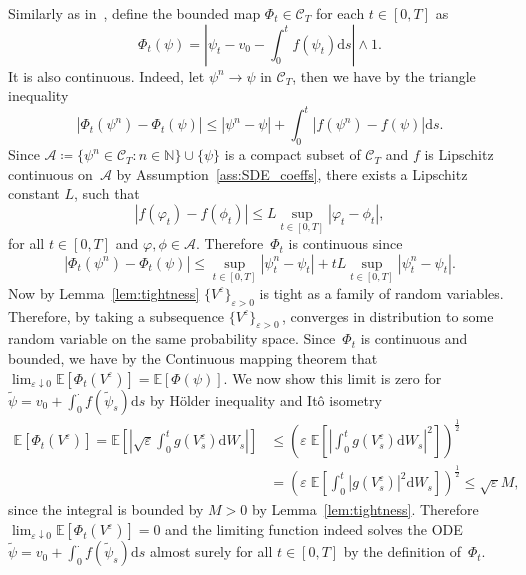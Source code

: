 \documentclass{amsart}[11pt]
\numberwithin{equation}{section}
\numberwithin{theorem}{subsection}
\numberwithin{proposition}{subsection}
\numberwithin{definition}{subsection}
\numberwithin{lemma}{subsection}
\numberwithin{assumption}{subsection}
\newcommand{\Aa}{\mathcal{A}}
\newcommand{\Cc}{\mathcal{C}}
\newcommand{\NN}{\mathbb{N}}
\newcommand{\EE}{\mathbb{E}}
\newcommand{\D}{\mathrm{d}}
\newcommand{\eps}{\varepsilon}
\begin{document}
Similarly as in~\cite{Chiarini2014}, define the bounded map $\Phi_t\in\Cc_T$ for each $t\in[0,T]$ as 
$$
\Phi_t(\psi) = \left \vert \psi_t - v_0 - \int_0^t f(\psi_t)\D s \right \vert \land 1.
$$
It is also continuous. 
Indeed, let $\psi^n \rightarrow \psi$ in $\Cc_T$, then we have by the triangle inequality 
$$
\left \vert \Phi_t(\psi^n) - \Phi_t(\psi) \right \vert \leq  \left \vert \psi^n - \psi \right \vert + \int_0^t \left \vert f(\psi^n) - f(\psi) \right \vert\D s.
$$
Since $\Aa\coloneqq \{\psi^n\in\Cc_T: n\in\NN\}\cup \{\psi\}$ is a compact subset of $\Cc_T$ and $f$ is Lipschitz continuous on~$\Aa$ by Assumption~\ref{ass:SDE_coeffs}, there exists a Lipschitz constant $L$, such that
\[
\left\vert f(\varphi_t) - f(\phi_t) \right\vert \leq L \sup_{t\in[0,T]} |\varphi_t - \phi_t|,
\]
for all $t\in[0,T]$ and $\varphi, \phi\in\Aa$. 
Therefore~$\Phi_t$ is continuous since
$$
\left \vert \Phi_t(\psi^n) - \Phi_t(\psi) \right \vert \leq \sup_{t\in[0,T]} \left \vert\psi_t^n - \psi_t\right \vert + t L \sup_{t\in[0,T]} \left \vert\psi_t^n - \psi_t\right \vert.
$$
Now by Lemma~\ref{lem:tightness} $\{V^\eps\}_{\eps>0}$ is tight as a family of random variables. Therefore, by taking a subsequence $\{V^\eps\}_{\eps>0}\,$, converges in distribution to some random variable on the same probability space. 
Since~$\Phi_t$ is continuous and bounded, we have by the Continuous mapping theorem that $\lim_{\eps\downarrow 0} \EE[\Phi_t(V^\eps)]=\EE[\Phi(\psi)]$. We now show this limit is zero for 
$\widetilde{\psi}=v_0 + \int_{0}^{\cdot} f(\widetilde{\psi}_s)\D s$ by H\"older inequality and It\^o isometry
\begin{align*}
\EE[\Phi_t(V^\eps)]
 = \EE\left[\left\vert \sqrt{\eps} \int_0^t g(V_s^\eps) \D W_s \right\vert\right]
  & \leq \left( \eps \; \EE\left[\left\vert \int_0^t g(V_s^\eps) \D W_s \right\vert^2\right] \right)^{\frac{1}{2}}\\
  &= \left( \eps \; \EE\left[ \int_0^t \left\vert g(V_s^\eps)\right\vert^2 \D W_s \right] \right)^{\frac{1}{2}}
  \leq \sqrt{\eps} M,
\end{align*}
since the integral is bounded by $M>0$ by Lemma~\ref{lem:tightness}.
Therefore $\lim_{\eps\downarrow 0} \EE[\Phi_t(V^\eps)] = 0$
and the limiting function indeed solves the ODE $\widetilde{\psi}=v_0 + \int_{0}^{\cdot} f(\widetilde{\psi}_s)\D s$ 
almost surely for all $t\in[0,T]$ by the definition of~$\Phi_t$.


\end{document}
